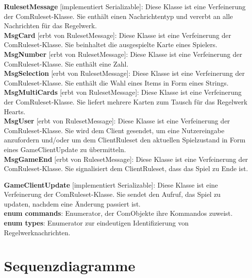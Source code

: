 \documentclass{article}
\begin{document}
\textbf{RulesetMessage} [implementiert Serializable]: Diese Klasse ist eine Verfeinerung der ComRuleset-Klasse. Sie enthält einen Nachrichtentyp und vererbt an alle Nachrichten für das Regelwerk.\\
		
\textbf{MsgCard} [erbt von RulesetMessage]: Diese Klasse ist eine Verfeinerung der ComRuleset-Klasse. Sie beinhaltet die ausgespielte Karte eines Spielers.\\
		
\textbf{MsgNumber} [erbt von RulesetMessage]: Diese Klasse ist eine Verfeinerung der ComRuleset-Klasse. Sie enthält eine Zahl.\\
		
\textbf{MsgSelection} [erbt von RulesetMessage]: Diese Klasse ist eine Verfeinerung der ComRuleset-Klasse. Sie enthält die Wahl eines Items in Form eines Strings.\\
		
\textbf{MsgMultiCards} [erbt von RulesetMessage]: Diese Klasse ist eine Verfeinerung der ComRuleset-Klasse. Sie liefert mehrere Karten zum Tausch für das Regelwerk Hearts. \\
		
\textbf{MsgUser} [erbt von RulesetMessage]: Diese Klasse ist eine Verfeinerung der ComRuleset-Klasse. Sie wird dem Client gesendet, um eine Nutzereingabe anzufordern und/oder um dem ClientRuleset den aktuellen Spielzustand in Form eines GameClientUpdate zu übermitteln. \\

\textbf{MsgGameEnd} [erbt von RulesetMessage]: Diese Klasse ist eine Verfeinerung der ComRuleset-Klasse. Sie signalisiert dem ClientRuleset, dass das Spiel zu Ende ist.
		
\textbf{GameClientUpdate} [implementiert Serializable]: Diese Klasse ist eine Verfeinerung der ComRuleset-Klasse. Sie sendet den Aufruf, das Spiel zu updaten, nachdem eine Änderung passiert ist. \\
		
\textbf{enum commands}: Enumerator, der ComObjekte ihre Kommandos zuweist. \\
		
\textbf{enum types}: Enumerator zur eindeutigen Identifizierung von Regelwerknachrichten.
\ \\

\section{Sequenzdiagramme}
\end{document}
